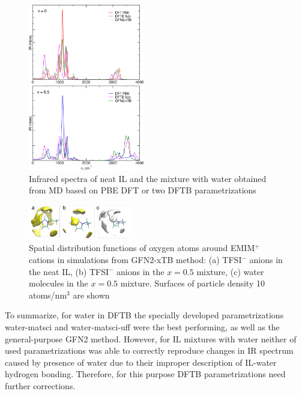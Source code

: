 \begin{figure}[H]
    \centering
    \includegraphics[width=0.45\textwidth]{img/5-alternatives-to-aimd/2-il-h2o/ir-dft-vs-dftb.png}
    \singlespacing
    \caption{Infrared spectra of neat IL and the mixture with water obtained from MD based on PBE DFT or two DFTB parametrizations}
    \label{fig:dftb-il-h2o-ir-dft-vs-dftb}
\end{figure}

\begin{figure}[H]
    \centering
    \includegraphics[width=0.4\textwidth]{img/5-alternatives-to-aimd/2-il-h2o/sdf-il.png}
    \singlespacing
    \caption{Spatial distribution functions of oxygen atoms around EMIM$^{+}$ cations in simulations from GFN2-xTB method: (a) TFSI$^{-}$ anions in the neat IL, (b) TFSI$^{-}$ anions in the $x = 0.5$ mixture, (c) water molecules in the $x = 0.5$ mixture. Surfaces of particle density 10 atoms/nm$^3$ are shown}
    \label{fig:dftb-il-h2o-sdf-il}
\end{figure}

To summarize, for water in DFTB the specially developed parametrizations water-matsci and water-matsci-uff were the best performing, as well as the general-purpose GFN2 method. However, for IL mixtures with water neither of used parametrizations was able to correctly reproduce changes in IR spectrum caused by presence of water due to their improper description of IL-water hydrogen bonding. Therefore, for this purpose DFTB parametrizations need further corrections.

